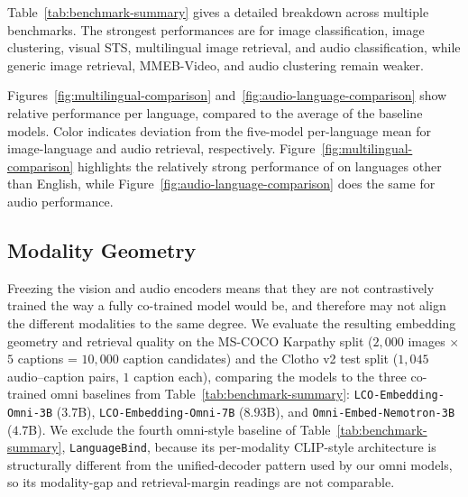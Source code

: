 Table~\ref{tab:benchmark-summary} gives a detailed breakdown across multiple benchmarks. The strongest \omniSmall{} performances are for image classification, image clustering, visual STS, multilingual image retrieval, and audio classification, while generic image retrieval, MMEB-Video, and audio clustering remain weaker.

Figures~\ref{fig:multilingual-comparison} and~\ref{fig:audio-language-comparison} show relative performance per language, compared to the average of the baseline models. Color indicates deviation from the five-model per-language mean for image-language and audio retrieval, respectively.
Figure~\ref{fig:multilingual-comparison} highlights the relatively strong performance of \omniSmall{} on languages other than English, while Figure~\ref{fig:audio-language-comparison} does the same for audio performance.

\subsection{Modality Geometry}
\label{sec:exp:modality-geometry}

Freezing the vision and audio encoders means that they are not contrastively trained the way a fully co-trained model would be, and therefore may not align the different modalities to the same degree.
We evaluate the resulting embedding geometry and retrieval quality on the MS-COCO Karpathy split ($2{,}000$ images $\times$ $5$ captions = $10{,}000$ caption candidates) and the Clotho v2 test split ($1{,}045$ audio--caption pairs, $1$ caption each), comparing the \omniBase{} models to the three co-trained omni baselines from Table~\ref{tab:benchmark-summary}: \texttt{LCO-Embedding-\allowbreak Omni-3B} ($3.7$B), \texttt{LCO-Embedding-Omni-7B} ($8.93$B), and \texttt{Omni-Embed-\allowbreak Nemotron-3B} ($4.7$B).
We exclude the fourth omni-style baseline of Table~\ref{tab:benchmark-summary}, \texttt{LanguageBind}, because its per-modality CLIP-style architecture is structurally different from the unified-decoder pattern used by our omni models, so its modality-gap and retrieval-margin readings are not comparable.

